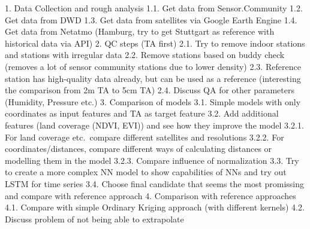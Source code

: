 1. Data Collection and rough analysis
  1.1. Get data from Sensor.Community
  1.2. Get data from DWD
  1.3. Get data from satellites via Google Earth Engine
  1.4. Get data from Netatmo (Hamburg, try to get Stuttgart as reference with historical data via API)
2. QC steps (TA first)
  2.1. Try to remove indoor stations and stations with irregular data
  2.2. Remove stations based on buddy check (removes a lot of sensor community stations due to lower density)
  2.3. Reference station has high-quality data already, but can be used as a reference (interesting the comparison from 2m TA to 5cm TA)
  2.4. Discuss QA for other parameters (Humidity, Pressure etc.)
3. Comparison of models
  3.1. Simple models with only coordinates as input features and TA as target feature
  3.2. Add additional features (land coverage (NDVI, EVI)) and see how they improve the model
    3.2.1. For land coverage etc.\ compare different satellites and resolutions
    3.2.2. For coordinates/distances, compare different ways of calculating distances or modelling them in the model
    3.2.3. Compare influence of normalization
  3.3. Try to create a more complex NN model to show capabilities of NNs and try out LSTM for time series
  3.4. Choose final candidate that seems the most promissing and compare with reference approach
4. Comparison with reference approaches
  4.1. Compare with simple Ordinary Kriging approach (with different kernels)
  4.2. Discuss problem of not being able to extrapolate